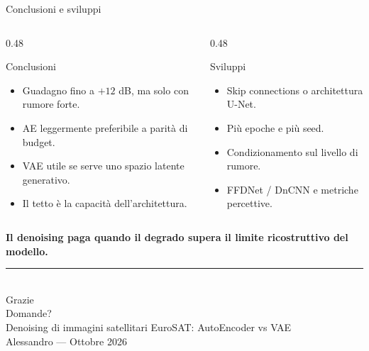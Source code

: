 \documentclass[aspectratio=169,t]{beamer}
\begin{document}
\begin{frame}{Conclusioni e sviluppi}
  \begin{columns}[T,onlytextwidth]
    \begin{column}{0.48\textwidth}
      \begin{block}{Conclusioni}
        \begin{itemize}
          \item Guadagno fino a $+12$ dB, ma solo con rumore forte.
          \item AE leggermente preferibile a parità di budget.
          \item VAE utile se serve uno spazio latente generativo.
          \item Il tetto è la capacità dell'architettura.
        \end{itemize}
      \end{block}
    \end{column}
    \begin{column}{0.48\textwidth}
      \begin{block}{Sviluppi}
        \begin{itemize}
          \item Skip connections o architettura U-Net.
          \item Più epoche e più seed.
          \item Condizionamento sul livello di rumore.
          \item FFDNet / DnCNN e metriche percettive.
        \end{itemize}
      \end{block}
    \end{column}
  \end{columns}

  \vspace{0.25cm}
  \centering
  {\color{primary}\bfseries Il denoising paga quando il degrado supera il limite ricostruttivo del modello.}
\end{frame}

\begin{frame}[plain]
  \centering
  \vspace*{1.4cm}
  {\color{accent}\rule{2.4cm}{2.5pt}}\\[0.9em]
  {\color{primary}Grazie}\\[0.6em]
  {\large\color{muted}Domande?}\\[2.2em]
  {\small\color{muted}Denoising di immagini satellitari EuroSAT: AutoEncoder vs VAE}\\[0.25em]
  {\small\color{muted}Alessandro --- Ottobre 2026}
\end{frame}
\end{document}
